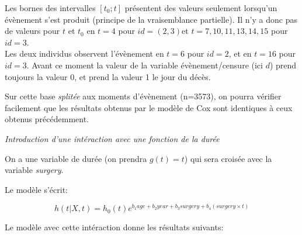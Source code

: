 \documentclass[
  12pt,
  letterpaper,
  DIV=11,
  numbers=noendperiod,
  onepage,
  openany]{scrreprt}
\begin{document}
Les bornes des intervalles \([t_0;t]\) présentent des valeurs seulement
lorsqu'un évènement s'est produit (principe de la vraisemblance
partielle). Il n'y a donc pas de valeurs pour \(t\) et \(t_0\) en
\(t=4\) pour \(id=(2,3)\)et \(t=7,10,11,13,14,15\) pour \(id=3\).\\
Les deux individus observent l'évènement en \(t=6\) pour \(id=2\), et en
\(t=16\) pour \(id=3\). Avant ce moment la valeur de la variable
évènement/censure (ici \(d\)) prend toujours la valeur 0, et prend la
valeur 1 le jour du décès.

Sur cette base \emph{splitée} aux moments d'évènement (n=3573), on
pourra vérifier facilement que les résultats obtenus par le modèle de
Cox sont identiques à ceux obtenus précédemment.

\emph{Introduction d'une intéraction avec une fonction de la durée}

On a une variable de durée (on prendra \(g(t)=t\)) qui sera croisée avec
la variable \emph{surgery}.

Le modèle s'écrit:

\[h(t | X,t) = h_0(t)e^{b_1age + b_2year + b_3 surgery + b_4 (surgery\times t)}\]

Le modèle avec cette intéraction donne les résultats suivants:
\end{document}
